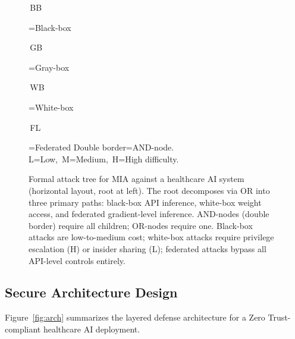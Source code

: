 \documentclass[conference]{IEEEtran}
\begin{document}
\begin{figure}[t]
		\vspace{4pt}
		\scriptsize
		\colorbox{blue!7}{\strut\,BB\,}=Black-box\quad
		\colorbox{orange!7}{\strut\,GB\,}=Gray-box\quad
		\colorbox{red!7}{\strut\,WB\,}=White-box\quad
		\colorbox{purple!7}{\strut\,FL\,}=Federated\quad
		Double border=AND-node.\quad
		L=Low,\ M=Medium,\ H=High difficulty.
		\caption{Formal attack tree for MIA against a healthcare AI system (horizontal layout, root at left). The root decomposes via OR into three primary paths: black-box API inference, white-box weight access, and federated gradient-level inference. AND-nodes (double border) require all children; OR-nodes require one. Black-box attacks are low-to-medium cost; white-box attacks require privilege escalation (H) or insider sharing (L); federated attacks bypass all API-level controls entirely.}
		\label{fig:attacktree}
	\end{figure}

	\subsection{Secure Architecture Design}
	Figure~\ref{fig:arch} summarizes the layered defense architecture for a Zero Trust-compliant healthcare AI deployment.
\end{document}
